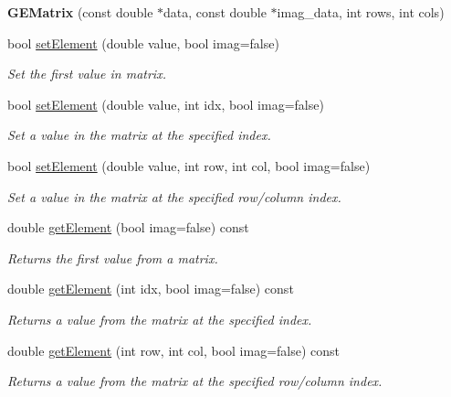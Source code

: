 \begin{DoxyCompactItemize}
\item 
\mbox{\label{class_g_e_matrix_aca9df504bab5a9bcaa6321e51e7a3062}} 
{\bfseries G\+E\+Matrix} (const double $\ast$data, const double $\ast$imag\+\_\+data, int rows, int cols)
\item 
bool \hyperlink{class_g_e_matrix_a9cb8b883469fb739b326d4d4a6ca9b4f}{set\+Element} (double value, bool imag=false)
\begin{DoxyCompactList}\small\item\em Set the first value in matrix. \end{DoxyCompactList}\item 
bool \hyperlink{class_g_e_matrix_a10f13d07ac7a962d90a58133cd9dd360}{set\+Element} (double value, int idx, bool imag=false)
\begin{DoxyCompactList}\small\item\em Set a value in the matrix at the specified index. \end{DoxyCompactList}\item 
bool \hyperlink{class_g_e_matrix_aaadecf68d646c2575446e7c1e2307047}{set\+Element} (double value, int row, int col, bool imag=false)
\begin{DoxyCompactList}\small\item\em Set a value in the matrix at the specified row/column index. \end{DoxyCompactList}\item 
double \hyperlink{class_g_e_matrix_a88c636c028a0cd12eb8ed77e33a1b86e}{get\+Element} (bool imag=false) const
\begin{DoxyCompactList}\small\item\em Returns the first value from a matrix. \end{DoxyCompactList}\item 
double \hyperlink{class_g_e_matrix_a3a02dfd155c17ae41aafdd0907367bb7}{get\+Element} (int idx, bool imag=false) const
\begin{DoxyCompactList}\small\item\em Returns a value from the matrix at the specified index. \end{DoxyCompactList}\item 
double \hyperlink{class_g_e_matrix_a36e2ef8c4e8fcba15410f8f19042c1a7}{get\+Element} (int row, int col, bool imag=false) const
\begin{DoxyCompactList}\small\item\em Returns a value from the matrix at the specified row/column index. \end{DoxyCompactList}\item 

\end{DoxyCompactItemize}

